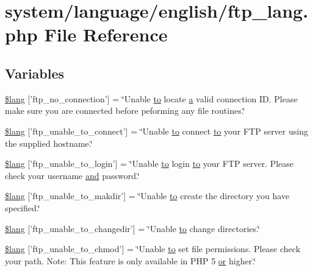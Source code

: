 \hypertarget{ftp__lang_8php}{\section{system/language/english/ftp\-\_\-lang.php File Reference}
\label{ftp__lang_8php}
}
\subsection*{Variables}
\begin{DoxyCompactItemize}
\item 
\hyperlink{ftp__lang_8php_a8630404f8e0c3750f8d997f35622b6eb}{\$lang} \mbox{[}'ftp\-\_\-no\-\_\-connection'\mbox{]} = \char`\"{}Unable \hyperlink{mathquill_8js_ae3622f38202b3532cd6eae25726945f8}{to} locate \hyperlink{bootstrap_8min_8js_a7318f59fb86a4437995ee89c780c51ac}{a} valid connection I\-D. Please make sure you are connected before peforming any file routines.\char`\"{}
\item 
\hyperlink{ftp__lang_8php_a57d51cf019dd2e380b84c6e31cda0cf5}{\$lang} \mbox{[}'ftp\-\_\-unable\-\_\-to\-\_\-connect'\mbox{]} = \char`\"{}Unable \hyperlink{mathquill_8js_ae3622f38202b3532cd6eae25726945f8}{to} connect \hyperlink{mathquill_8js_ae3622f38202b3532cd6eae25726945f8}{to} your F\-T\-P server using the supplied hostname.\char`\"{}
\item 
\hyperlink{ftp__lang_8php_affe13cbf898e1802abb3cd9d9ce2db97}{\$lang} \mbox{[}'ftp\-\_\-unable\-\_\-to\-\_\-login'\mbox{]} = \char`\"{}Unable \hyperlink{mathquill_8js_ae3622f38202b3532cd6eae25726945f8}{to} login \hyperlink{mathquill_8js_ae3622f38202b3532cd6eae25726945f8}{to} your F\-T\-P server. Please check your username \hyperlink{mathquill_8js_ac39c488ee3bd6d675c340966d33495a7}{and} password.\char`\"{}
\item 
\hyperlink{ftp__lang_8php_a8669265afd6d483a551808d784edbd3f}{\$lang} \mbox{[}'ftp\-\_\-unable\-\_\-to\-\_\-makdir'\mbox{]} = \char`\"{}Unable \hyperlink{mathquill_8js_ae3622f38202b3532cd6eae25726945f8}{to} create the directory you have specified.\char`\"{}
\item 
\hyperlink{ftp__lang_8php_a2e8eab1a2d2d33cde249097df270b7df}{\$lang} \mbox{[}'ftp\-\_\-unable\-\_\-to\-\_\-changedir'\mbox{]} = \char`\"{}Unable \hyperlink{mathquill_8js_ae3622f38202b3532cd6eae25726945f8}{to} change directories.\char`\"{}
\item 
\hyperlink{ftp__lang_8php_a9ffd10144a0dfd5a3c7ab69e4edf1fdf}{\$lang} \mbox{[}'ftp\-\_\-unable\-\_\-to\-\_\-chmod'\mbox{]} = \char`\"{}Unable \hyperlink{mathquill_8js_ae3622f38202b3532cd6eae25726945f8}{to} set file permissions. Please check your path. Note\-: This feature is only available in P\-H\-P 5 \hyperlink{mathquill_8js_a6fdf1c439b25d95597e99492b728acaa}{or} higher.\char`\"{}

\end{DoxyCompactItemize}

